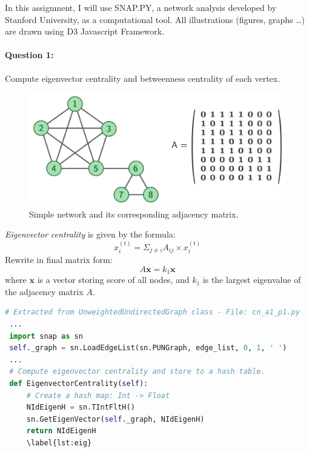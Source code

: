 \documentclass[a4paper,12pt]{article}
\begin{document}
\noindent
In this assignment, I will use SNAP.PY, a network analysis developed by Stanford University, as a computational tool. All illustrations (figures, graphs \ldots) are drawn using D3 Javascript Framework.

\paragraph{Question 1:} Compute eigenvector centrality and betweenness centrality of each vertex.

\begin{figure}[h]
    \includegraphics[width=\textwidth]{cn_a2_net}
    \caption{Simple network and its corresponding adjacency matrix.}
    \label{fig:net}
\end{figure}

\noindent
\emph{Eigenvector centrality} is given by the formula:
$$ x_i^{(t)}= \Sigma_{j \neq i} A_{ij} \times x_i^{(t)} $$
Rewrite in final matrix form:
$$ A\boldsymbol{x} = k_1\boldsymbol{x} $$
where $\boldsymbol{x}$ is a vector storing score of all nodes, and $k_1$ is the largest eigenvalue of the adjacency matrix $A$.

\begin{lstlisting}[language=Python, caption={Eigenvector centrality computation with SNAP.PY}]
 # Extracted from UnweightedUndirectedGraph class - File: cn_a1_p1.py
 ...
 import snap as sn
 self._graph = sn.LoadEdgeList(sn.PUNGraph, edge_list, 0, 1, ' ')
 ...
 # Compute eigenvector centrality and store to a hash table.
 def EigenvectorCentrality(self):
     # Create a hash map: Int -> Float
     NIdEigenH = sn.TIntFltH()
     sn.GetEigenVector(self._graph, NIdEigenH)
     return NIdEigenH
     \label{lst:eig}
\end{lstlisting}

\pagebreak
\end{document}
